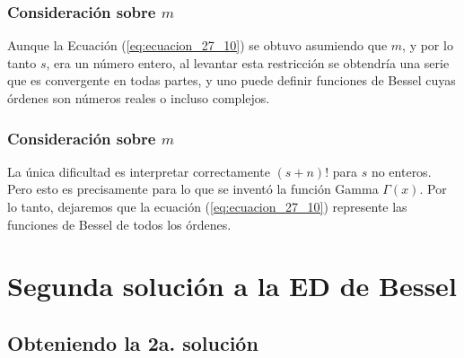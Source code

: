 \documentclass[12pt]{beamer}
\begin{document}
\begin{frame}
\frametitle{Consideración sobre $m$}
Aunque la Ecuación (\ref{eq:ecuacion_27_10}) se obtuvo asumiendo que $m$, y por lo tanto $s$, era un número entero, \pause al levantar esta restricción se obtendría una serie que es convergente en todas partes, y uno puede definir funciones de Bessel cuyas órdenes son números reales o incluso complejos.
\end{frame}
\begin{frame}
\frametitle{Consideración sobre $m$}
La única dificultad es interpretar correctamente $(s + n)!$ para $s$ no enteros.
\\
\bigskip
\pause
Pero esto es precisamente para lo que se inventó la función Gamma $\Gamma (x)$. \pause Por lo tanto, dejaremos que la ecuación (\ref{eq:ecuacion_27_10}) represente las funciones de Bessel de todos los órdenes.
\end{frame}

\section{Segunda solución a la ED de Bessel}
\subsection{Obteniendo la 2a. solución}
\end{document}

